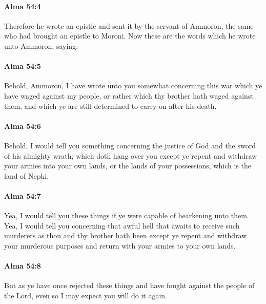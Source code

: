 		\paragraph{Alma 54:4} %
			\label{ALMA-54-4}

			Therefore he wrote an epistle and sent it by the servant of Ammoron,
			the same who had brought an epistle to Moroni.
			Now these are the words which he wrote unto Ammoron, saying:

		\paragraph{Alma 54:5} %
			\label{ALMA-54-5}

			Behold, Ammoron, I have wrote unto you somewhat
			concerning this war which ye have waged against my people,
			or rather which thy brother hath waged against them,
			and which ye are still determined to carry on after his death.

		\paragraph{Alma 54:6} %
			\label{ALMA-54-6}

			Behold, I would tell you something concerning the justice of God
			and the sword of his almighty wrath, which doth hang over you
			except ye repent and withdraw your armies into your own lands,
			or the lands of your possessions, which is the land of Nephi.

		\paragraph{Alma 54:7} %
			\label{ALMA-54-7}

			Yea, I would tell you these things
			if ye were capable of hearkening unto them.
			Yea, I would tell you concerning that awful hell
			that awaits to receive such murderers as thou and thy brother hath been
			except ye repent and withdraw your murderous purposes
			and return with your armies to your own lands.

		\paragraph{Alma 54:8} %
			\label{ALMA-54-8}

			But as ye have once rejected these things
			and have fought against the people of the Lord,
			even so I may expect you will do it again.

